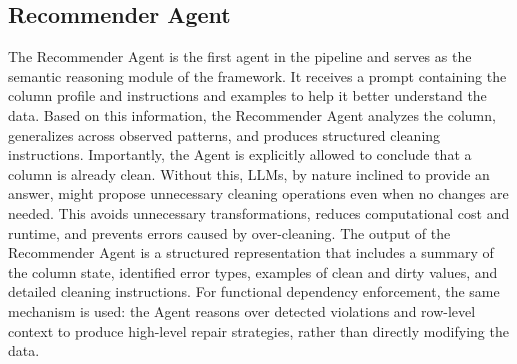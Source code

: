 \subsection{Recommender Agent}
The Recommender Agent is the first agent in the pipeline and serves as the semantic reasoning module of the framework. 
It receives a prompt containing the column profile and instructions and examples to help it better understand the data. 
Based on this information, the Recommender Agent analyzes the column, generalizes across observed patterns, and produces structured cleaning instructions. 
Importantly, the Agent is explicitly allowed to conclude that a column is already clean. 
Without this, LLMs, by nature inclined to provide an answer, might propose unnecessary cleaning operations even when no changes are needed. 
This avoids unnecessary transformations, reduces computational cost and runtime, and prevents errors caused by over-cleaning. 
The output of the Recommender Agent is a structured representation that includes a summary of the column state, identified error types, examples of clean and dirty values, and detailed cleaning instructions. 
For functional dependency enforcement, the same mechanism is used: the Agent reasons over detected violations and row-level context to produce high-level repair strategies, rather than directly modifying the data.

